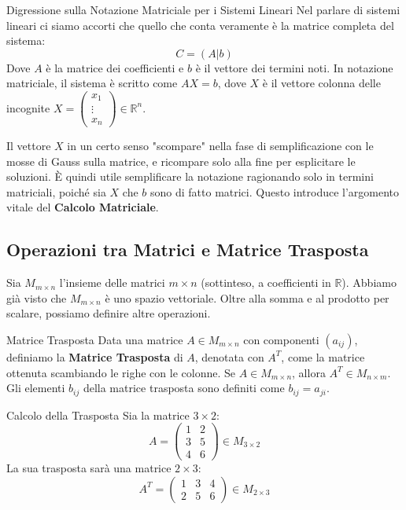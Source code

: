 \documentclass[11pt,a4paper]{article}
\begin{document}
\begin{concept}{Digressione sulla Notazione Matriciale per i Sistemi Lineari}{}
Nel parlare di sistemi lineari ci siamo accorti che quello che conta veramente è la matrice completa del sistema:
$$ C = (A | b) $$
Dove $A$ è la matrice dei coefficienti e $b$ è il vettore dei termini noti. In notazione matriciale, il sistema è scritto come $AX = b$, dove $X$ è il vettore colonna delle incognite $X = \begin{pmatrix} x_1 \\ \vdots \\ x_n \end{pmatrix} \in \mathbb{R}^n$.

Il vettore $X$ in un certo senso "scompare" nella fase di semplificazione con le mosse di Gauss sulla matrice, e ricompare solo alla fine per esplicitare le soluzioni. È quindi utile semplificare la notazione ragionando solo in termini matriciali, poiché sia $X$ che $b$ sono di fatto matrici. Questo introduce l'argomento vitale del \textbf{Calcolo Matriciale}.
\end{concept}

\subsection{Operazioni tra Matrici e Matrice Trasposta}
Sia $M_{m \times n}$ l'insieme delle matrici $m \times n$ (sottinteso, a coefficienti in $\mathbb{R}$).
Abbiamo già visto che $M_{m \times n}$ è uno spazio vettoriale. Oltre alla somma e al prodotto per scalare, possiamo definire altre operazioni.

\begin{definition}{Matrice Trasposta}{}
Data una matrice $A \in M_{m \times n}$ con componenti $(a_{ij})$, definiamo la \textbf{Matrice Trasposta} di $A$, denotata con $A^T$, come la matrice ottenuta scambiando le righe con le colonne.
Se $A \in M_{m \times n}$, allora $A^T \in M_{n \times m}$.
Gli elementi $b_{ij}$ della matrice trasposta sono definiti come $b_{ij} = a_{ji}$.
\end{definition}

\begin{example}{Calcolo della Trasposta}{}
Sia la matrice $3 \times 2$:
$$ A = \begin{pmatrix} 1 & 2 \\ 3 & 5 \\ 4 & 6 \end{pmatrix} \in M_{3 \times 2} $$
La sua trasposta sarà una matrice $2 \times 3$:
$$ A^T = \begin{pmatrix} 1 & 3 & 4 \\ 2 & 5 & 6 \end{pmatrix} \in M_{2 \times 3} $$
\end{example}
\end{document}
